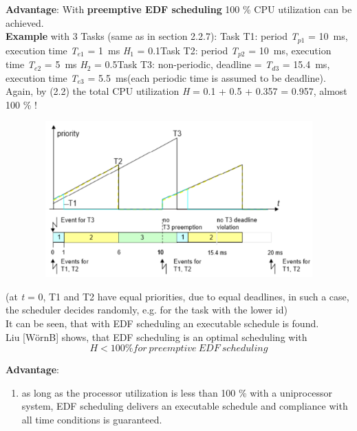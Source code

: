 \textbf{Advantage}: With \textbf{preemptive EDF scheduling }100 \% CPU utilization can be achieved. \\

\textbf{Example} with 3 Tasks (same as in section 2.2.7): Task T1: period \textit{T}${}_{p1}$ = 10~ms, execution time \textit{T}${}_{e1}$ = 1~ms  \textit{H}${}_{1}$ = 0.1Task T2: period \textit{T}${}_{p2}$ = 10~ms, execution time\textit{ T}${}_{e2}$ = 5~ms  \textit{H}${}_{2}$ = 0.5Task T3: non-periodic, deadline = \textit{T}${}_{d3}$ = 15.4~ms, execution time\textit{ T}${}_{e3}$ = 5.5~ms(each periodic time is assumed to be deadline).\\

Again, by (2.2) the total CPU utilization \textit{H} = 0.1 + 0.5 + 0.357 = 0.957, almost 100 \% !\\

 	\begin{figure}[h]
    \centering
    \includegraphics[width=13cm, height=6cm]{Images/image101.png}
    \label{fig:Fig 47}
    \end{figure}

(at \textit{t} = 0, T1 and T2 have equal priorities, due to equal deadlines, in such a case, the scheduler decides randomly, e.g. for the task with the lower id)\\

It can be seen, that with EDF scheduling an executable schedule is found. \\

Liu [W\"{o}rnB] shows, that EDF scheduling is an optimal scheduling with\\

\begin{equation}
	H \mathrm{<} 100 \% for\ preemptive\ EDF\ scheduling
\label{EQ }
\end{equation}

\textbf{Advantage}: 

\begin{enumerate}
\item  as long as the processor utilization is less than 100 \% with a uniprocessor system, EDF  scheduling delivers an executable schedule and compliance with all time conditions is guaranteed.
\end{enumerate}

